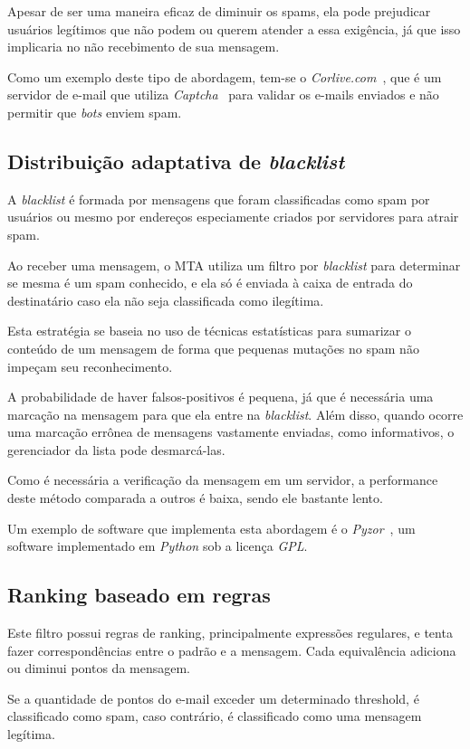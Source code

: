 \documentclass[a4paper,dvipdfm]{article}
\begin{document}
\begin{description}
		Apesar de ser uma maneira eficaz de diminuir os spams, ela pode prejudicar usuários legítimos que não podem ou querem atender a essa exigência, já que isso implicaria no não recebimento de sua mensagem.

		Como um exemplo deste tipo de abordagem, tem-se o \emph{Corlive.com}~\cite{corlive}, que é um servidor de e-mail que utiliza \emph{Captcha}~\cite{captcha} para validar os e-mails enviados e não permitir que \emph{bots} enviem spam.

	\subsection{Distribuição adaptativa de \emph{blacklist}}
		A \emph{blacklist} é formada por mensagens que foram classificadas como spam por usuários ou mesmo por endereços especiamente criados por servidores para atrair spam.

		Ao receber uma mensagem, o MTA utiliza um filtro por \emph{blacklist} para determinar se mesma é um spam conhecido, e ela só é enviada à caixa de entrada do destinatário caso ela não seja classificada como ilegítima.

		Esta estratégia se baseia no uso de técnicas estatísticas para sumarizar o conteúdo de um mensagem de forma que pequenas mutações no spam não impeçam seu reconhecimento.

		A probabilidade de haver falsos-positivos é pequena, já que é necessária uma marcação na mensagem para que ela entre na \emph{blacklist}. Além disso, quando ocorre uma marcação errônea de mensagens vastamente enviadas, como informativos, o gerenciador da lista pode desmarcá-las.
		
		Como é necessária a verificação da mensagem em um servidor, a performance deste método comparada a outros é baixa, sendo ele bastante lento.

		Um exemplo de software que implementa esta abordagem é o \emph{Pyzor}~\cite{pyzor}, um software implementado em \emph{Python} sob a licença \emph{GPL}.

	\subsection{Ranking baseado em regras}
		Este filtro possui regras de ranking, principalmente expressões regulares, e tenta fazer correspondências entre o padrão e a mensagem. 
		Cada equivalência adiciona ou diminui pontos da mensagem.
		
		Se a quantidade de pontos do e-mail exceder um determinado threshold, é classificado como spam, caso contrário, é classificado como uma mensagem legítima.


\end{description}
\end{document}
